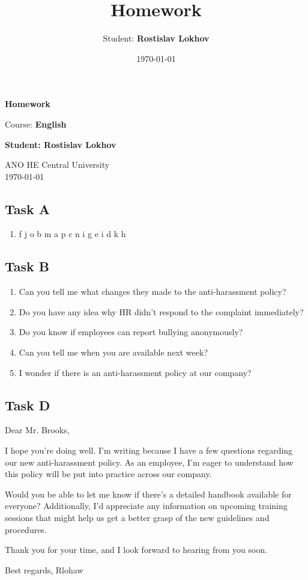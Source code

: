 \documentclass[a4paper,12pt,english]{article}
\title{Homework}
\author{Student: \textbf{Rostislav Lokhov}}
\date{\today}
\begin{document}
\begin{titlepage}
    \centering
    \vspace*{1cm}

    \Huge
    \textbf{Homework}

    \vspace{0.5cm}
    \LARGE
    Course: \textbf{English}

    \vspace{1.5cm}

    \textbf{Student: Rostislav Lokhov}

    \vfill

    \Large
    ANO HE Central University\\
    \vspace{0.3cm}
    \today

\end{titlepage}


\subsection{Task A}
\begin{enumerate}
    \item f j o b m a p c n i g e i d k h
\end{enumerate}

\subsection{Task B}
\begin{enumerate}
    \item Can you tell me what changes they made to the anti-harassment policy?
    \item Do you have any idea why HR didn’t respond to the complaint immediately?
    \item Do you know if employees can report bullying anonymously?
    \item Can you tell me when you are available next week?
    \item I wonder if there is an anti-harassment policy at our company?
\end{enumerate}

\subsection{Task D}
Dear Mr. Brooks,

I hope you’re doing well. I’m writing because I have a few questions regarding our new anti-harassment policy. As an employee, I’m eager to understand how this policy will be put into practice across our company.

Would you be able to let me know if there’s a detailed handbook available for everyone? Additionally, I’d appreciate any information on upcoming training sessions that might help us get a better grasp of the new guidelines and procedures.

Thank you for your time, and I look forward to hearing from you soon.

Best regards,
Rlohaw
\end{document}
